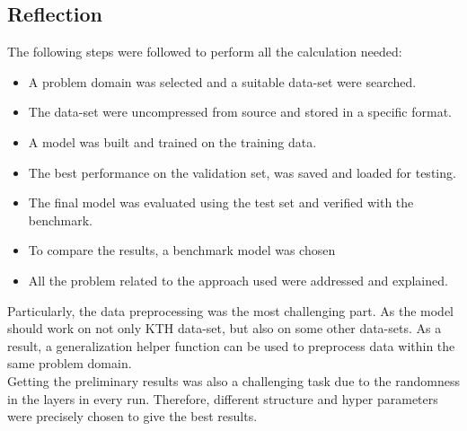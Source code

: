 \subsection{Reflection}
\hspace{5mm} The following steps were followed to perform all the calculation needed:\\
\begin{itemize}
    \item A problem domain was selected and a suitable data-set were searched.
    \item The data-set were uncompressed from source and stored in a specific format.
    \item A model was built and trained on the training data. 
    \item The best performance on the validation set, was saved and loaded for testing.
    \item The final model was evaluated using the test set and verified with the benchmark.
    \item To compare the results, a benchmark model was chosen
    \item All the problem related to the approach used were addressed and explained.
    
\end{itemize}
\hspace{5mm} Particularly, the data preprocessing was the most challenging part. As the model should work on not only KTH data-set, but also on some other data-sets. As a result, a generalization helper function can be used to preprocess data within the same problem domain.\\

Getting the preliminary results was also a challenging task due to the randomness in the layers in every run. Therefore, different structure and hyper parameters were precisely chosen to give the best results.

